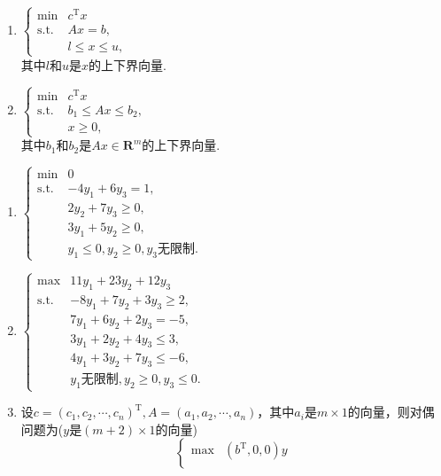 \begin{enumerate}
\begin{enumerate}[label=(\arabic*)]
        \item $\begin{cases}
            \min & c^{\mathrm{T}}x\\
            \text{s.t.} & Ax=b,\\
            & l \leqslant x \leqslant u,
        \end{cases}$
        \\其中$l$和$u$是$x$的上下界向量.
        \item $\begin{cases}
            \min & c^{\mathrm{T}}x\\
            \text{s.t.} & b_1 \leqslant Ax \leqslant b_2,\\
            & x \geqslant 0,
        \end{cases}$
        \\其中$b_1$和$b_2$是$Ax \in \textbf{R}^{m}$的上下界向量.
    \end{enumerate}
    \sol
    \begin{enumerate}[label=(\arabic*)]
        \item $\begin{cases}
            \min & 0\\
            \text{s.t.} & -4y_1+6y_3 = 1,\\
            & 2y_2+7y_3 \geqslant 0,\\
            & 3y_1+5y_2 \geqslant 0,\\
            & y_1 \leqslant 0, y_2 \geqslant 0, y_3 \text{无限制}.
        \end{cases}$
        \item $\begin{cases}
            \max & 11y_1+23y_2+12y_3\\
            \text{s.t.} & -8y_1+7y_2+3y_3 \geqslant 2,\\
            & 7y_1+6y_2+2y_3 = -5,\\
            & 3y_1+2y_2+4y_3 \leqslant 3,\\
            & 4y_1+3y_2+7y_3 \leqslant -6,\\
            & y_1 \text{无限制}, y_2 \geqslant 0, y_3 \leqslant 0.
        \end{cases}$
        \item 设$c=(c_1,c_2,\cdots,c_n)^{\mathrm{T}},A=(a_1,a_2,\cdots,a_n)$，其中$a_i$是$m \times 1$的向量，则对偶问题为($y$是$(m+2) \times 1$的向量)
        \[\begin{cases}
            \max & (b^{\mathrm{T}},0,0)y\\

\end{cases}\]
\end{enumerate}
\end{enumerate}

